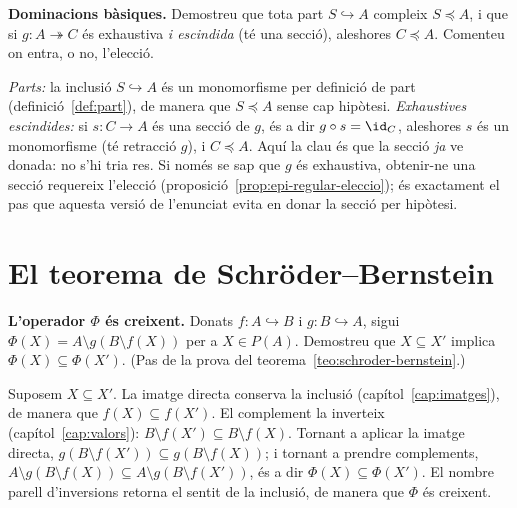 \begin{exercici}
\textbf{Dominacions bàsiques.} Demostreu que tota part \(S\hookrightarrow A\) compleix \(S\preceq A\), i que si \(g\colon A\twoheadrightarrow C\) és exhaustiva \emph{i escindida} (té una secció), aleshores \(C\preceq A\). Comenteu on entra, o no, l'elecció.
\end{exercici}
\begin{solucio}
\emph{Parts:} la inclusió \(S\hookrightarrow A\) és un monomorfisme per definició de part (definició~\ref{def:part}), de manera que \(S\preceq A\) sense cap hipòtesi. \emph{Exhaustives escindides:} si \(s\colon C\to A\) és una secció de \(g\), és a dir \(g\circ s=\id_C\), aleshores \(s\) és un monomorfisme (té retracció \(g\)), i \(C\preceq A\). Aquí la clau és que la secció \emph{ja} ve donada: no s'hi tria res. Si només se sap que \(g\) és exhaustiva, obtenir-ne una secció requereix l'elecció (proposició~\ref{prop:epi-regular-eleccio}); és exactament el pas que aquesta versió de l'enunciat evita en donar la secció per hipòtesi.
\end{solucio}

\section{El teorema de Schröder--Bernstein}\label{prac:sb}

\begin{exercici}
\textbf{L'operador \(\Phi\) és creixent.} Donats \(f\colon A\hookrightarrow B\) i \(g\colon B\hookrightarrow A\), sigui \(\Phi(X)=A\setminus g(B\setminus f(X))\) per a \(X\in P(A)\). Demostreu que \(X\subseteq X'\) implica \(\Phi(X)\subseteq\Phi(X')\). (Pas de la prova del teorema~\ref{teo:schroder-bernstein}.)
\end{exercici}
\begin{solucio}
Suposem \(X\subseteq X'\). La imatge directa conserva la inclusió (capítol~\ref{cap:imatges}), de manera que \(f(X)\subseteq f(X')\). El complement la inverteix (capítol~\ref{cap:valors}): \(B\setminus f(X')\subseteq B\setminus f(X)\). Tornant a aplicar la imatge directa, \(g(B\setminus f(X'))\subseteq g(B\setminus f(X))\); i tornant a prendre complements, \(A\setminus g(B\setminus f(X))\subseteq A\setminus g(B\setminus f(X'))\), és a dir \(\Phi(X)\subseteq\Phi(X')\). El nombre parell d'inversions retorna el sentit de la inclusió, de manera que \(\Phi\) és creixent.
\end{solucio}

